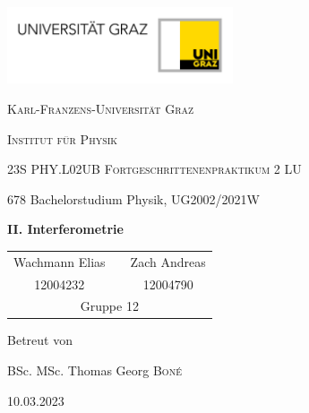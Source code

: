 \documentclass[ngerman]{scrartcl}
\begin{document}
\begin{titlepage}
    \centering
    \includegraphics[width=0.5\textwidth]{../../99_Misc/Logo_Uni_Graz.jpg}\par\vspace{0.8cm}
    {\scshape\LARGE Karl-Franzens-Universität Graz \par}
    {\scshape\LARGE Institut für Physik \par}
    \vspace{1cm}
    {\scshape\Large 23S PHY.L02UB Fortgeschrittenenpraktikum 2 LU
\par}
    678 Bachelorstudium Physik, UG2002/2021W\par
    \vspace{1.5cm}
    {\huge\bfseries II. Interferometrie\par}
    \vspace{2cm}
    \begin{table}[H]
        \centering
        \begin{tabular}{c c c}
           \Large Wachmann Elias & & \Large Zach Andreas \\
           \Large 12004232       & & \Large 12004790 \\
           \multicolumn{3}{c}{Gruppe 12}
        \end{tabular}
    \end{table}
    \vfill
    \Large Betreut von\par
    BSc. MSc. Thomas Georg \textsc{Boné}

    \vfill

    {\large 10.03.2023\par}
\end{titlepage}

\clearpage
\tableofcontents
\newpage
\end{document}
